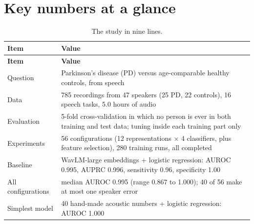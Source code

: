 \documentclass[11pt,a4paper]{article}
\begin{document}
\section*{Key numbers at a glance}
\begin{center}\small\renewcommand{\arraystretch}{1.15}
\begin{longtable}{>{\raggedright\arraybackslash}p{3.17cm}>{\raggedright\arraybackslash}p{12.49cm}}
\caption{The study in nine lines.}\\
\toprule
\textbf{\hspace{0pt}Item} & \textbf{\hspace{0pt}Value}\\\midrule\endfirsthead
\toprule
\textbf{\hspace{0pt}Item} & \textbf{\hspace{0pt}Value}\\\midrule\endhead
\bottomrule\endfoot
\hspace{0pt}Question & \hspace{0pt}Parkinson's disease (PD) versus age-comparable healthy controls, from speech\\
\hspace{0pt}Data & \hspace{0pt}785 recordings from 47 speakers (25 PD, 22 controls), 16 speech tasks, 5.0 hours of audio\\
\hspace{0pt}Evaluation & \hspace{0pt}5-fold cross-validation in which no person is ever in both training and test data; tuning inside each training part only\\
\hspace{0pt}Experiments & \hspace{0pt}56 configurations (12 representations $\times$ 4 classifiers, plus feature selection), 280 training runs, all completed\\
\hspace{0pt}Baseline & \hspace{0pt}WavLM-large embeddings +\allowbreak{} logistic regression: AUROC 0.995, AUPRC 0.996, sensitivity 0.96, specificity 1.00\\
\hspace{0pt}All configurations & \hspace{0pt}median AUROC 0.995 (range 0.867 to 1.000); 40 of 56 make at most one speaker error\\
\hspace{0pt}Simplest model & \hspace{0pt}40 hand-made acoustic numbers +\allowbreak{} logistic regression: AUROC 1.000\\

\end{longtable}
\end{center}
\end{document}
